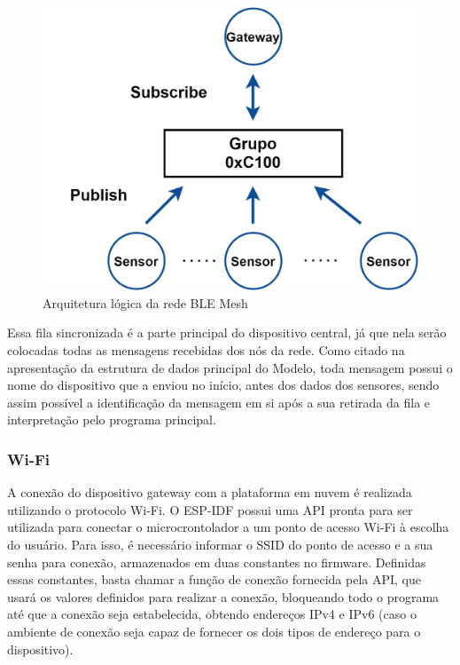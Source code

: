 \documentclass[../monografia.tex]{subfiles}
\begin{document}
\begin{figure}[h!]
	\centering
	\includegraphics[scale=0.20]{ble-mesh-architecture.png}
	\caption{Arquitetura lógica da rede BLE Mesh}
	\label{fig:mesh-network-architecture}
\end{figure}

Essa fila sincronizada é a parte principal do dispositivo central, já que nela serão colocadas todas as mensagens recebidas dos nós da rede. Como citado na apresentação da estrutura de dados principal do Modelo, toda mensagem possui o nome do dispositivo que a enviou no início, antes dos dados dos sensores, sendo assim possível a identificação da mensagem em si após a sua retirada da fila e interpretação pelo programa principal.


\subsubsection{Wi-Fi} \label{dev-Wi-Fi}

A conexão do dispositivo gateway com a plataforma em nuvem é realizada utilizando o protocolo Wi-Fi. O ESP-IDF possui uma API pronta para ser utilizada para conectar o microcrontolador a um ponto de acesso Wi-Fi à escolha do usuário. Para isso, é necessário informar o SSID do ponto de acesso e a sua senha para conexão, armazenados em duas constantes no firmware. Definidas essas constantes, basta chamar a função de conexão fornecida pela API, que usará os valores definidos para realizar a conexão, bloqueando todo o programa até que a conexão seja estabelecida, obtendo endereços IPv4 e IPv6 (caso o ambiente de conexão seja capaz de fornecer os dois tipos de endereço para o dispositivo).
\end{document}
